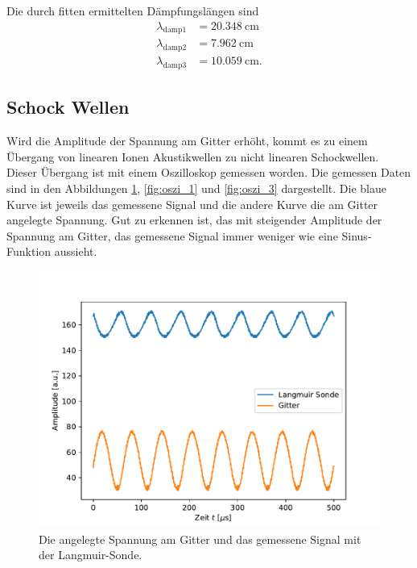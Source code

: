 Die durch fitten ermittelten Dämpfungslängen sind
\begin{align}
  \lambda_{\mathrm{damp} 1} &= 20.348\ \mathrm{cm} \\
  \lambda_{\mathrm{damp} 2} &=  7.962\  \mathrm{cm} \\
  \lambda_{\mathrm{damp} 3} &= 10.059\  \mathrm{cm}. 
\end{align}  
\subsection{Schock Wellen}
Wird die Amplitude der Spannung am Gitter erhöht, kommt es zu einem Übergang von linearen Ionen Akustikwellen zu nicht linearen Schockwellen.  Dieser Übergang ist mit einem Oszilloskop gemessen worden. Die gemessen Daten sind in den Abbildungen \ref{fig:oszi_2}, \ref{fig:oszi_1} und \ref{fig:oszi_3} dargestellt. Die blaue Kurve ist jeweils das gemessene Signal und die andere Kurve die am Gitter angelegte Spannung. Gut zu erkennen ist, das mit steigender Amplitude der Spannung am Gitter, das gemessene Signal immer weniger wie eine Sinus-Funktion aussieht. 
\begin{figure}[H]
\centering
\includegraphics[scale=0.6]{oszi_2.pdf}
\caption{Die angelegte Spannung am Gitter und das gemessene Signal mit der Langmuir-Sonde.}
\label{fig:oszi_2}
\end{figure}

